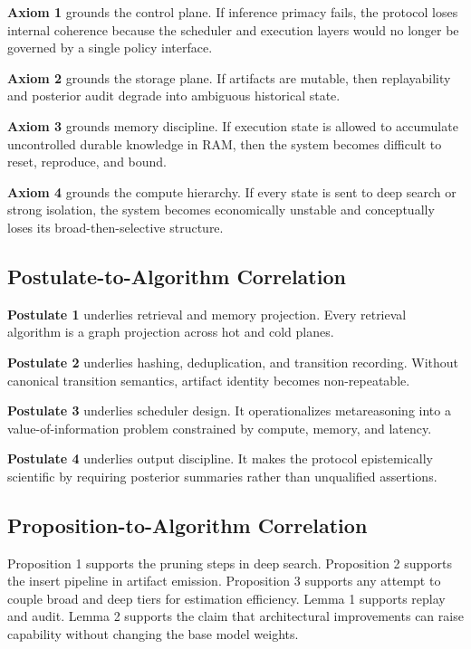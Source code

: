 \documentclass[11pt]{article}
\theoremstyle{definition}
\begin{document}
\textbf{Axiom 1} grounds the control plane. If inference primacy fails, the protocol loses internal coherence because the scheduler and execution layers would no longer be governed by a single policy interface.

\textbf{Axiom 2} grounds the storage plane. If artifacts are mutable, then replayability and posterior audit degrade into ambiguous historical state.

\textbf{Axiom 3} grounds memory discipline. If execution state is allowed to accumulate uncontrolled durable knowledge in RAM, then the system becomes difficult to reset, reproduce, and bound.

\textbf{Axiom 4} grounds the compute hierarchy. If every state is sent to deep search or strong isolation, the system becomes economically unstable and conceptually loses its broad-then-selective structure.

\subsection{Postulate-to-Algorithm Correlation}

\textbf{Postulate 1} underlies retrieval and memory projection. Every retrieval algorithm is a graph projection across hot and cold planes.

\textbf{Postulate 2} underlies hashing, deduplication, and transition recording. Without canonical transition semantics, artifact identity becomes non-repeatable.

\textbf{Postulate 3} underlies scheduler design. It operationalizes metareasoning into a value-of-information problem constrained by compute, memory, and latency.

\textbf{Postulate 4} underlies output discipline. It makes the protocol epistemically scientific by requiring posterior summaries rather than unqualified assertions.

\subsection{Proposition-to-Algorithm Correlation}

Proposition 1 supports the pruning steps in deep search.  
Proposition 2 supports the insert pipeline in artifact emission.  
Proposition 3 supports any attempt to couple broad and deep tiers for estimation efficiency.  
Lemma 1 supports replay and audit.  
Lemma 2 supports the claim that architectural improvements can raise capability without changing the base model weights.
\end{document}
